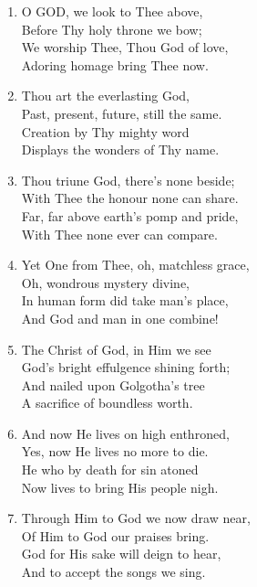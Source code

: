 \begin{enumerate}
    \item O GOD, we look to Thee above, \\
        Before Thy holy throne we bow; \\
        We worship Thee, Thou God of love, \\
        Adoring homage bring Thee now.

    \item Thou art the everlasting God, \\
        Past, present, future, still the same. \\
        Creation by Thy mighty word \\
        Displays the wonders of Thy name.

    \item Thou triune God, there's none beside; \\
        With Thee the honour none can share. \\
        Far, far above earth's pomp and pride, \\
        With Thee none ever can compare.

    \item Yet One from Thee, oh, matchless grace, \\
        Oh, wondrous mystery divine, \\
        In human form did take man's place, \\
        And God and man in one combine!

    \item The Christ of God, in Him we see \\
        God's bright effulgence shining forth; \\
        And nailed upon Golgotha's tree \\
        A sacrifice of boundless worth.

    \item And now He lives on high enthroned, \\
        Yes, now He lives no more to die. \\
        He who by death for sin atoned \\
        Now lives to bring His people nigh.

    \item Through Him to God we now draw near, \\
        Of Him to God our praises bring. \\
        God for His sake will deign to hear, \\
        And to accept the songs we sing.

\end{enumerate}

